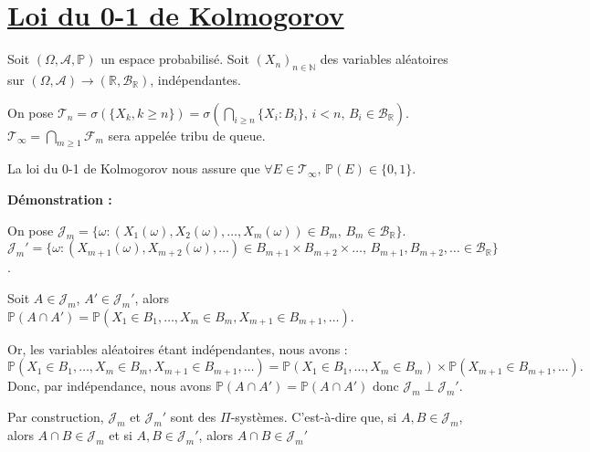\documentclass{article}
\begin{document}
\section*{\underline{Loi du 0-1 de Kolmogorov}}

Soit $(\Omega, \mathcal{A}, \mathbb{P})$ un espace probabilisé.  
Soit $(X_n)_{n \in \mathbb{N}}$ des variables aléatoires sur $(\Omega, \mathcal{A}) \rightarrow (\mathbb{R}, \mathcal{B}_\mathbb{R})$, indépendantes.  

\vspace{0.08cm}
\noindent
On pose $\mathcal{T}_n = \sigma\left(\{X_k, k \geq n\}\right) = \sigma\left(\bigcap_{i \geq n} \{X_i : B_i\}, \, i < n, \, B_i \in \mathcal{B}_\mathbb{R}\right)$.  
$\mathcal{T}_\infty = \bigcap_{m \geq 1} \mathcal{F}_m$ sera appelée tribu de queue.

\vspace{0.08cm}
\noindent
La loi du 0-1 de Kolmogorov nous assure que $\forall E \in \mathcal{T}_\infty, \, \mathbb{P}(E) \in \{0, 1\}$.

\vspace{0.7cm}
\noindent
\textbf{Démonstration :}

\vspace{0.3cm}
\noindent
On pose $\mathcal{J}_m = \{ \omega : (X_1(\omega), X_2(\omega), \ldots, X_m(\omega)) \in B_m, \, B_m \in \mathcal{B}_\mathbb{R} \}$.  
$\mathcal{J}_m' = \{ \omega : (X_{m+1}(\omega), X_{m+2}(\omega), \ldots) \in B_{m+1} \times B_{m+2} \times \ldots, \, B_{m+1}, B_{m+2}, \ldots \in \mathcal{B}_\mathbb{R} \}$.

\noindent
Soit $A \in \mathcal{J}_m$, $A' \in \mathcal{J}_m'$, alors $\mathbb{P}(A \cap A') = \mathbb{P}( X_1 \in B_1, \ldots, X_m \in B_m, X_{m+1} \in B_{m+1}, \ldots)$.  

\noindent
Or, les variables aléatoires étant indépendantes, nous avons :
\[
\mathbb{P}( X_1 \in B_1, \ldots, X_m \in B_m, X_{m+1} \in B_{m+1}, \ldots) = \mathbb{P}( X_1 \in B_1, \ldots, X_m \in B_m) \times \mathbb{P}( X_{m+1} \in B_{m+1}, \ldots).
\]
\noindent
Donc, par indépendance, nous avons $\mathbb{P}(A \cap A') = \mathbb{P}(A \cap A') \text{ donc } \mathcal{J}_m \perp \mathcal{J}_m'$.



\vspace{0.3cm}
\noindent
Par construction, $\mathcal{J}_m$ et $\mathcal{J}_m'$ sont des $\Pi$-systèmes. C'est-à-dire que,  si $A, B \in \mathcal{J}_m$, alors $A \cap B \in \mathcal{J}_m$ et  si $A, B \in \mathcal{J}_m'$, alors $A \cap B \in \mathcal{J}_m'$
\end{document}
